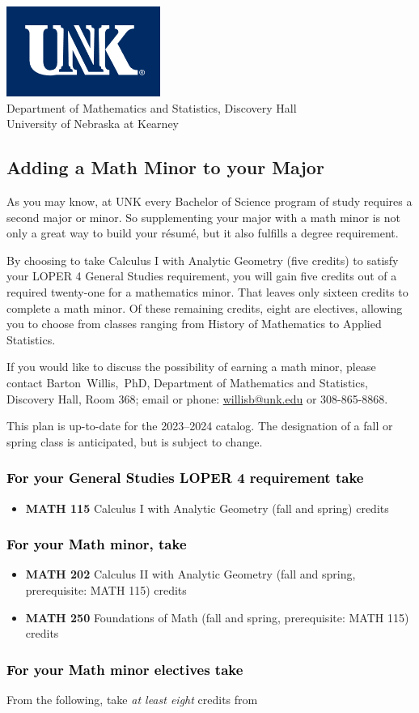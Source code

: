 \documentclass[10pt]{article}
\makeatletter
\newcommand{\calcone}{\textbf{MATH 115} Calculus I with Analytic Geometry (fall and spring) \dotfill 5 credits}
\newcommand{\calctwo}{\textbf{MATH 202} Calculus II with Analytic Geometry (fall and spring, prerequisite: MATH 115) \dotfill 5 credits }
\newcommand{\foundations}{\textbf{MATH 250} Foundations of Math (fall and spring, prerequisite: MATH 115)  \dotfill 3 credits}
\newcommand{\contactbw}{\mbox{Barton Willis, PhD}, Department of Mathematics and Statistics,  Discovery Hall, Room 368;
email or phone: \href{mailto:willisb@unk.edu}{willisb@unk.edu} or 308-865-8868.}
\newcommand{\forinfo}[2]{If you would like to discuss the possibility of earning a math {#1}, please contact \contactbw}
\newcommand{\catalog}{2023--2024 }
\newcommand{\LOPER}{LOPER\xspace}
\newcommand{\uptodate}{This plan is up-to-date for  the \catalog catalog. The designation of a fall or spring class is 
anticipated, but  is subject to change.}
\newcommand{\myheading}{
\begin{flushleft}
\includegraphics[scale=0.3]{unk-logo}\\
\setcounter{footnote}{0}
\vspace{0.25in}
 \textcolor{unkblue}{Department of Mathematics and Statistics, Discovery Hall} \\
  \textcolor{unkblue}{University of Nebraska at Kearney}
\end{flushleft}}
\makeatother
\begin{document}
\newpage

\myheading

\subsection*{\textbf{\textcolor{unkblue}{Adding a Math Minor to your Major}}}

As you may know, at UNK every Bachelor of Science program of study requires a second
major or minor. So supplementing your major with a math minor is not only a great
way to build your r\'esum\'e, but it also fulfills a degree requirement.

By choosing to take Calculus I with Analytic Geometry (five credits) to satisfy
your \LOPER 4 General Studies requirement, you will gain five credits out of a
required twenty-one for a mathematics minor. That leaves only sixteen credits
to complete a math minor.  Of these remaining credits, eight are electives, allowing
you to choose from classes ranging from History of Mathematics to Applied Statistics.


\forinfo{minor}{program of study}

\uptodate

\subsubsection*{\textcolor{black}{For your General Studies \LOPER 4 requirement take}}
\begin{itemize}
\item \calcone
\end{itemize}


\subsubsection*{\textcolor{black}{For your Math minor, take}}
\begin{itemize}
  \item \calctwo

\item \foundations
\end{itemize}

\subsubsection*{\textcolor{black}{For your Math minor electives take}}

From the following, take \emph{at least eight} credits from
\vspace{0.1in}
\end{document}
